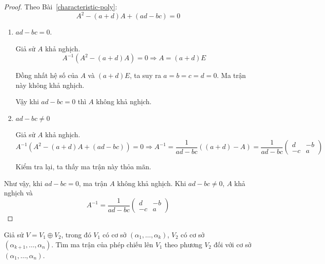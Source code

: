 \documentclass[class=nhvh-linear-algebra,crop=false]{standalone}
\begin{document}
\begin{proof}
    Theo Bài~\ref{characteristic-poly}:
    \[
        A^{2} - (a+d)A + (ad-bc) = 0
    \]
    \begin{enumerate}[label = Trường hợp \arabic*:,itemindent=2cm]
        \item $ad - bc = 0$.
              \par Giả sử $A$ khả nghịch.
              \[
                  A^{-1}(A^{2} - (a+d)A) = 0 \Rightarrow A = (a+d)E
              \]
              \par Đồng nhất hệ số của $A$ và $(a+d)E$, ta suy ra $a = b = c =d = 0$. Ma trận này không khả nghịch.
              \par Vậy khi $ad - bc = 0$ thì $A$ không khả nghịch.
        \item $ad - bc \ne 0$
              \par Giả sử $A$ khả nghịch.
              \[
                  A^{-1}(A^{2} - (a+d)A + (ad-bc)) = 0 \Rightarrow A^{-1} = \frac{1}{ad-bc}((a+d) - A) = \frac{1}{ad-bc}\begin{pmatrix}d & -b \\ -c & a\end{pmatrix}
              \]
              \par Kiểm tra lại, ta thấy ma trận này thỏa mãn.
    \end{enumerate}
    \par Như vậy, khi $ad - bc = 0$, ma trận $A$ không khả nghịch. Khi $ad - bc \ne 0$, $A$ khả nghịch và
    \[
        A^{-1} = \frac{1}{ad-bc}\begin{pmatrix}d & -b \\ -c & a\end{pmatrix}
    \]
\end{proof}

\begin{exercise}
    Giả sử $V = V_{1}\oplus V_{2}$, trong đó $V_{1}$ có cơ sở $(\alpha_{1}, \ldots, \alpha_{k})$, $V_{2}$ có cơ sở $(\alpha_{k+1}, \ldots, \alpha_{n})$. Tìm ma trận của phép chiếu lên $V_{1}$ theo phương $V_{2}$ đối với cơ sở $(\alpha_{1}, \ldots, \alpha_{n})$.
\end{exercise}
\end{document}
